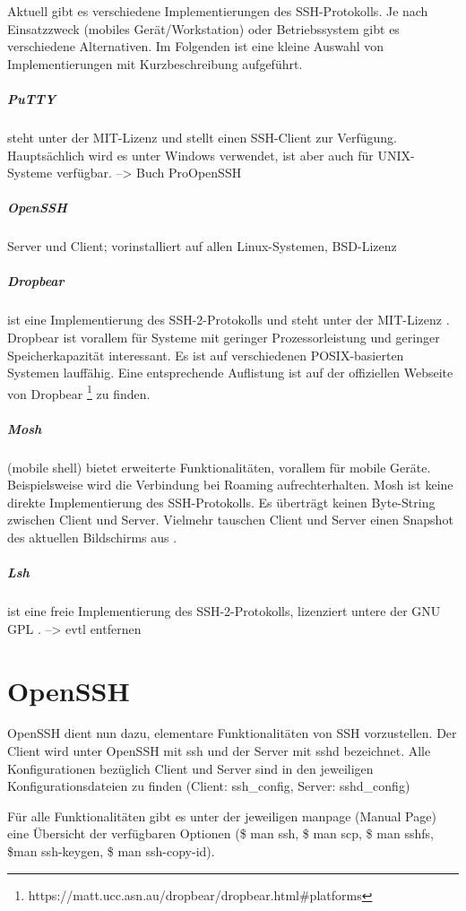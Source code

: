 \documentclass[ngerman,pdf]{wkcms}    %
\begin{document}
Aktuell gibt es verschiedene Implementierungen des SSH-Protokolls. Je nach Einsatzzweck (mobiles Gerät/Workstation) oder Betriebssystem gibt es verschiedene Alternativen. Im Folgenden ist eine kleine Auswahl von Implementierungen mit Kurzbeschreibung aufgeführt.

\subparagraph{PuTTY} steht unter der MIT-Lizenz und stellt einen SSH-Client zur Verfügung. Hauptsächlich wird es unter Windows verwendet, ist aber auch für UNIX-Systeme verfügbar.\cite{putty}  --> Buch ProOpenSSH 

\subparagraph{OpenSSH} Server und Client; vorinstalliert auf allen Linux-Systemen, BSD-Lizenz

\subparagraph{Dropbear} ist eine Implementierung des SSH-2-Protokolls und steht unter der MIT-Lizenz \cite{dropbear}. Dropbear ist vorallem für Systeme mit geringer Prozessorleistung und geringer Speicherkapazität interessant. Es ist auf verschiedenen POSIX-basierten Systemen lauffähig. Eine entsprechende Auflistung ist auf der offiziellen Webseite von Dropbear \footnote{https://matt.ucc.asn.au/dropbear/dropbear.html\#platforms} zu finden.

\subparagraph{Mosh} (mobile shell) bietet erweiterte Funktionalitäten, vorallem für mobile Geräte. Beispielsweise wird die Verbindung bei Roaming aufrechterhalten. Mosh ist keine direkte Implementierung des SSH-Protokolls. Es überträgt keinen Byte-String zwischen Client und Server. Vielmehr tauschen Client und Server einen Snapshot des aktuellen Bildschirms aus \cite{mosh}.

\subparagraph{Lsh} ist eine freie Implementierung des SSH-2-Protokolls, lizenziert untere der GNU GPL \cite{lsh}. --> evtl entfernen






\section{OpenSSH}

OpenSSH dient nun dazu, elementare Funktionalitäten von SSH vorzustellen. Der Client wird unter OpenSSH mit \IT ssh und der Server mit \IT sshd bezeichnet. Alle Konfigurationen bezüglich Client und Server sind in den jeweiligen Konfigurationsdateien zu finden (Client: ssh\_config, Server: sshd\_config)


Für alle Funktionalitäten gibt es unter der jeweiligen \IT manpage (Manual Page) eine Übersicht der verfügbaren Optionen (\$ man ssh, \$ man scp, \$ man sshfs, \$man ssh-keygen, \$ man ssh-copy-id). 
\end{document}
